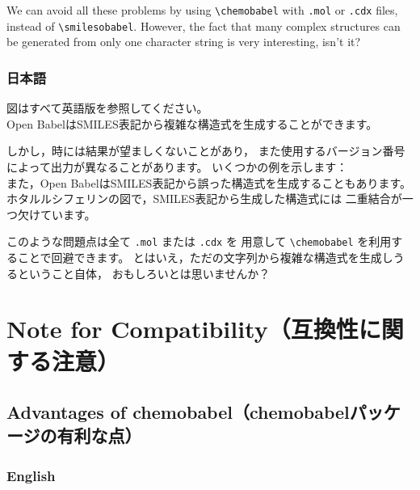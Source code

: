 \documentclass[12pt]{ltjsarticle}
\begin{document}
We can avoid all these problems by using \verb|\chemobabel| with \verb|.mol| or
\verb|.cdx| files, instead of \verb|\smilesobabel|.
However, the fact that many complex structures can be generated from
only one character string is very interesting, isn't it?

\subsubsection{日本語}

図はすべて英語版を参照してください。 \\

Open BabelはSMILES表記から複雑な構造式を生成することができます。

しかし，時には結果が望ましくないことがあり，
また使用するバージョン番号によって出力が異なることがあります。
いくつかの例を示します： \\

また，Open BabelはSMILES表記から誤った構造式を生成することもあります。
ホタルルシフェリンの図で，SMILES表記から生成した構造式には
二重結合が一つ欠けています。

このような問題点は全て \verb|.mol| または \verb|.cdx| を
用意して \verb|\chemobabel| を利用することで回避できます。
とはいえ，ただの文字列から複雑な構造式を生成しうるということ自体，
おもしろいとは思いませんか？

\clearpage

\section{Note for Compatibility（互換性に関する注意）}

\subsection{Advantages of \textsf{chemobabel}（\textsf{chemobabel}パッケージの有利な点）}

\subsubsection{English}
\end{document}
